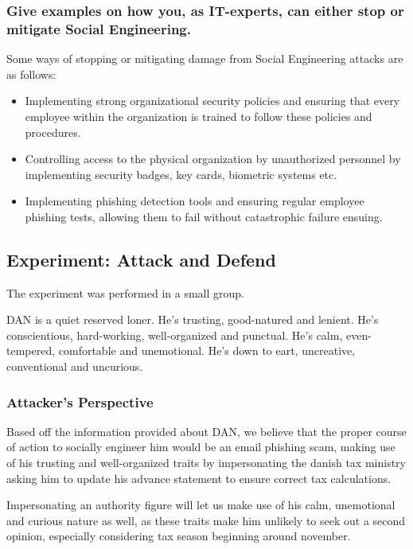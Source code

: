 \subsubsection{Give examples on how you, as IT-experts, can either stop or mitigate Social Engineering.}
Some ways of stopping or mitigating damage from Social Engineering attacks are as follows:
\begin{itemize}
    \item Implementing strong organizational security policies and ensuring that every employee within the organization is trained to follow these policies and procedures.
    \item Controlling access to the physical organization by unauthorized personnel by implementing security badges, key cards, biometric systems etc.
    \item Implementing phishing detection tools and ensuring regular employee phishing tests, allowing them to fail without catastrophic failure ensuing.
\end{itemize}

\subsection{Experiment: Attack and Defend}
The experiment was performed in a small group.

DAN is a quiet reserved loner. He's trusting, good-natured and lenient. He's conscientious, hard-working, well-organized and punctual. He's calm, even-tempered, comfortable and unemotional. He's down to eart, uncreative, conventional and uncurious.
\subsubsection{Attacker's Perspective}
Based off the information provided about DAN, we believe that the proper course of action to socially engineer him would be an email phishing scam, making use of his trusting and well-organized traits by impersonating the danish tax ministry asking him to update his advance statement to ensure correct tax calculations.

Impersonating an authority figure will let us make use of his calm, unemotional and curious nature as well, as these traits make him unlikely to seek out a second opinion, especially considering tax season beginning around november.
